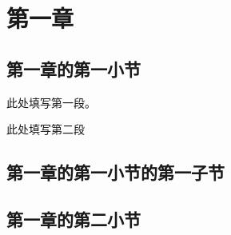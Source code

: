 \chapter{第一章}
\label{sec1}

\section{第一章的第一小节}
\label{sec1.1}

此处填写第一段。

此处填写第二段

\section{第一章的第一小节的第一子节}
\label{sec1.1.1}

\section{第一章的第二小节}
\label{sec1.2}